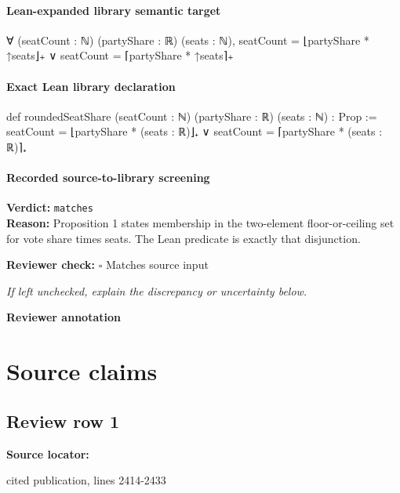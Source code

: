 \documentclass[10pt]{article}
\newcommand{\reviewerbox}{%
  \par\noindent\fbox{\parbox{0.96\linewidth}{\rule{0pt}{0.38in}}}\par
}
\newcommand{\reviewmatch}[1]{%
  \par\noindent\textbf{Reviewer check:} $\square$\; #1\par
  \noindent\emph{If left unchecked, explain the discrepancy or uncertainty below.}\par
}
\begin{document}
\paragraph{Lean-expanded library semantic target}
\begin{ReviewVerbatim}
∀ (seatCount : ℕ) (partyShare : ℝ) (seats : ℕ), seatCount = ⌊partyShare * ↑seats⌋₊ ∨ seatCount = ⌈partyShare * ↑seats⌉₊
\end{ReviewVerbatim}

\paragraph{Exact Lean library declaration}
\begin{ReviewVerbatim}
def roundedSeatShare (seatCount : ℕ) (partyShare : ℝ) (seats : ℕ) : Prop :=
  seatCount = ⌊partyShare * (seats : ℝ)⌋₊ ∨
    seatCount = ⌈partyShare * (seats : ℝ)⌉₊
\end{ReviewVerbatim}

\paragraph{Recorded source-to-library screening}
\textbf{Verdict:} \texttt{matches}
\\
\textbf{Reason:} Proposition 1 states membership in the two-element floor-or-ceiling set for vote share times seats. The Lean predicate is exactly that disjunction.
\reviewmatch{Matches source input}
\noindent\textbf{Reviewer annotation}\par
\reviewerbox

\clearpage
\hypertarget{source-claim-6ccc405fd526f01f}{}
\hypertarget{source-section-f10b5f68e4acf3dc}{}
\section*{Source claims}
\subsection*{Review row 1}
\textbf{Source locator:} {\footnotesize\raggedright cited publication, lines 2414-\allowbreak{}2433\par}
\end{document}
